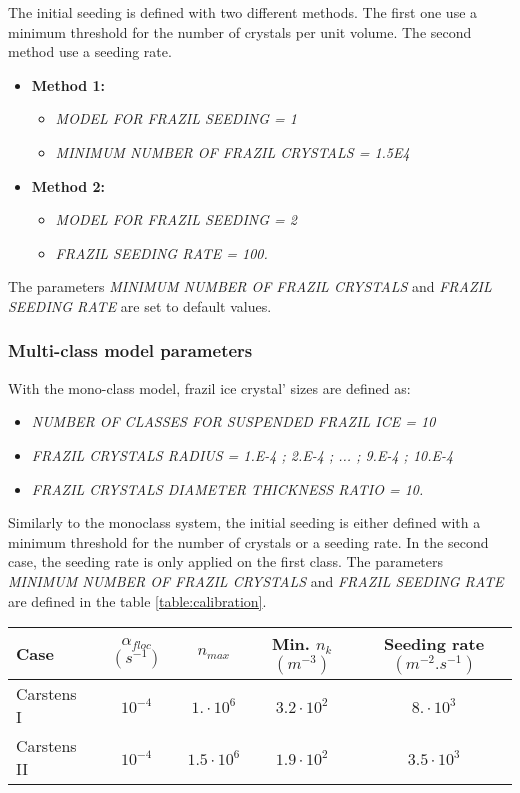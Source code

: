 The initial seeding is defined with two different methods.
The first one use a minimum threshold for the number of crystals per unit volume.
The second method use a seeding rate. 
\begin{itemize}
\item \textbf{Method 1:}
    \begin{itemize}
	    \item\textit{MODEL FOR FRAZIL SEEDING = 1}
	    \item\textit{MINIMUM NUMBER OF FRAZIL CRYSTALS = 1.5E4}
    \end{itemize}
\item \textbf{Method 2:}
    \begin{itemize}
	    \item\textit{MODEL FOR FRAZIL SEEDING = 2}
	    \item\textit{FRAZIL SEEDING RATE = 100.}
    \end{itemize}
\end{itemize}
The parameters \textit{MINIMUM NUMBER OF FRAZIL CRYSTALS} and \textit{FRAZIL SEEDING RATE} are set to default values.

\subsubsection{Multi-class model parameters}
With the mono-class model, frazil ice crystal' sizes are defined as:
\begin{itemize}
	\item\textit{NUMBER OF CLASSES FOR SUSPENDED FRAZIL ICE = 10}
	\item\textit{FRAZIL CRYSTALS RADIUS = 1.E-4 ; 2.E-4 ; ... ; 9.E-4 ; 10.E-4}
	\item\textit{FRAZIL CRYSTALS DIAMETER THICKNESS RATIO = 10.}
\end{itemize}

Similarly to the monoclass system, the initial seeding is either defined 
with a minimum threshold for the number of crystals or a seeding rate.
In the second case, the seeding rate is only applied on the first class.
The parameters \textit{MINIMUM NUMBER OF FRAZIL CRYSTALS} and \textit{FRAZIL SEEDING RATE} 
are defined in the table \ref{table:calibration}.

\begin{center}
\begin{tabular}{lcccc}
\hline
Case & $\alpha_{floc}$ $(s^{-1})$ & $n_{max}$ & Min. $n_k$ $(m^{-3})$ & Seeding rate $(m^{-2}.s^{-1})$ \\
\hline \hline
Carstens I & $10^{-4}$ & $ 1. \cdot 10^{6}$ & $3.2 \cdot 10^{2}$ & $8. \cdot 10^{3}$ \\
\hline
Carstens II & $10^{-4}$ & $1.5 \cdot 10^{6}$ & $1.9 \cdot 10^{2}$ & $3.5 \cdot 10^{3}$ \\
\hline
\end{tabular}
\label{table:calibration}
\end{center}

